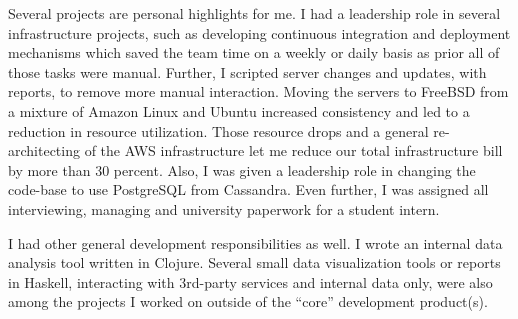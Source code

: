 \documentclass[margintitle,line]{res}
\begin{document}
\begin{resume}
\begin{position}


  Several projects are personal highlights for me. I had a leadership role
  in several infrastructure projects, such as developing continuous integration
  and deployment mechanisms which saved the team time on a weekly or daily basis
  as prior all of those tasks were manual. Further, I scripted server changes
  and updates, with reports, to remove more manual interaction. Moving the
  servers to FreeBSD from a mixture of Amazon Linux and Ubuntu increased
  consistency and led to a reduction in resource utilization. Those resource
  drops and a general re-architecting of the AWS infrastructure let me
  reduce our total infrastructure bill by more than 30 percent. Also, I was
  given a leadership role in changing the code-base to use PostgreSQL from Cassandra.
  Even further, I was assigned all interviewing, managing and university paperwork
  for a student intern.


  I had other general development responsibilities as well. I wrote an
  internal data analysis tool written in Clojure. Several small data visualization
  tools or reports in Haskell, interacting with 3rd-party services and internal
  data only, were also among the projects I worked on outside of the ``core''
  development product(s).


\end{position}
\end{resume}
\end{document}

